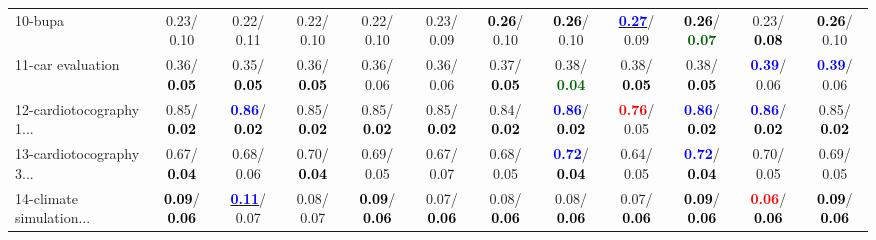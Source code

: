 \begin{table}[h]
\begin{center}
{\begin{tabular}{lc|c|c|c|c|c|c|c|c|c|c}
10-bupa &   0.23/  0.10 &   0.22/  0.11 &   0.22/  0.10 &   0.22/  0.10 &   0.23/  0.09 & \textcolor{black}{\textbf{  0.26}}/  0.10 & \textcolor{black}{\textbf{  0.26}}/  0.10 & \underline{\textcolor{blue}{\textbf{  0.27}}}/  0.09 & \textcolor{black}{\textbf{  0.26}}/\textcolor{darkgreen}{\textbf{  0.07}} &   0.23/\textcolor{black}{\textbf{  0.08}} & \textcolor{black}{\textbf{  0.26}}/  0.10 \\
11-car evaluation &   0.36/\textcolor{black}{\textbf{  0.05}} &   0.35/\textcolor{black}{\textbf{  0.05}} &   0.36/\textcolor{black}{\textbf{  0.05}} &   0.36/  0.06 &   0.36/  0.06 &   0.37/\textcolor{black}{\textbf{  0.05}} &   0.38/\textcolor{darkgreen}{\textbf{  0.04}} &   0.38/\textcolor{black}{\textbf{  0.05}} &   0.38/\textcolor{black}{\textbf{  0.05}} & \textcolor{blue}{\textbf{  0.39}}/  0.06 & \textcolor{blue}{\textbf{  0.39}}/  0.06 \\
12-cardiotocography 1... &   0.85/\textcolor{black}{\textbf{  0.02}} & \textcolor{blue}{\textbf{  0.86}}/\textcolor{black}{\textbf{  0.02}} &   0.85/\textcolor{black}{\textbf{  0.02}} &   0.85/\textcolor{black}{\textbf{  0.02}} &   0.85/\textcolor{black}{\textbf{  0.02}} &   0.84/\textcolor{black}{\textbf{  0.02}} & \textcolor{blue}{\textbf{  0.86}}/\textcolor{black}{\textbf{  0.02}} & \textcolor{red}{\textbf{  0.76}}/  0.05 & \textcolor{blue}{\textbf{  0.86}}/\textcolor{black}{\textbf{  0.02}} & \textcolor{blue}{\textbf{  0.86}}/\textcolor{black}{\textbf{  0.02}} &   0.85/\textcolor{black}{\textbf{  0.02}} \\
13-cardiotocography 3... &   0.67/\textcolor{black}{\textbf{  0.04}} &   0.68/  0.06 &   0.70/\textcolor{black}{\textbf{  0.04}} &   0.69/  0.05 &   0.67/  0.07 &   0.68/  0.05 & \textcolor{blue}{\textbf{  0.72}}/\textcolor{black}{\textbf{  0.04}} &   0.64/  0.05 & \textcolor{blue}{\textbf{  0.72}}/\textcolor{black}{\textbf{  0.04}} &   0.70/  0.05 &   0.69/  0.05 \\
14-climate simulation... & \textcolor{black}{\textbf{  0.09}}/\textcolor{black}{\textbf{  0.06}} & \underline{\textcolor{blue}{\textbf{  0.11}}}/  0.07 &   0.08/  0.07 & \textcolor{black}{\textbf{  0.09}}/\textcolor{black}{\textbf{  0.06}} &   0.07/\textcolor{black}{\textbf{  0.06}} &   0.08/\textcolor{black}{\textbf{  0.06}} &   0.08/\textcolor{black}{\textbf{  0.06}} &   0.07/\textcolor{black}{\textbf{  0.06}} & \textcolor{black}{\textbf{  0.09}}/\textcolor{black}{\textbf{  0.06}} & \textcolor{red}{\textbf{  0.06}}/\textcolor{black}{\textbf{  0.06}} & \textcolor{black}{\textbf{  0.09}}/\textcolor{black}{\textbf{  0.06}} \\ \hline

\end{tabular}}
\end{center}
\end{table}
